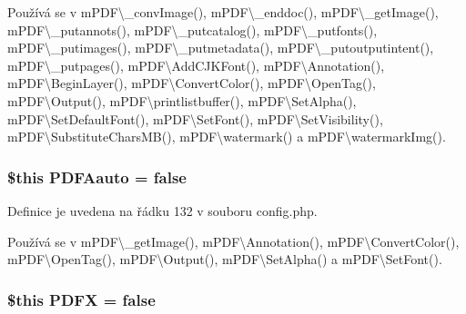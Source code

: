 Používá se v m\-P\-D\-F\textbackslash{}\-\_\-conv\-Image(), m\-P\-D\-F\textbackslash{}\-\_\-enddoc(), m\-P\-D\-F\textbackslash{}\-\_\-get\-Image(), m\-P\-D\-F\textbackslash{}\-\_\-putannots(), m\-P\-D\-F\textbackslash{}\-\_\-putcatalog(), m\-P\-D\-F\textbackslash{}\-\_\-putfonts(), m\-P\-D\-F\textbackslash{}\-\_\-putimages(), m\-P\-D\-F\textbackslash{}\-\_\-putmetadata(), m\-P\-D\-F\textbackslash{}\-\_\-putoutputintent(), m\-P\-D\-F\textbackslash{}\-\_\-putpages(), m\-P\-D\-F\textbackslash{}\-Add\-C\-J\-K\-Font(), m\-P\-D\-F\textbackslash{}\-Annotation(), m\-P\-D\-F\textbackslash{}\-Begin\-Layer(), m\-P\-D\-F\textbackslash{}\-Convert\-Color(), m\-P\-D\-F\textbackslash{}\-Open\-Tag(), m\-P\-D\-F\textbackslash{}\-Output(), m\-P\-D\-F\textbackslash{}printlistbuffer(), m\-P\-D\-F\textbackslash{}\-Set\-Alpha(), m\-P\-D\-F\textbackslash{}\-Set\-Default\-Font(), m\-P\-D\-F\textbackslash{}\-Set\-Font(), m\-P\-D\-F\textbackslash{}\-Set\-Visibility(), m\-P\-D\-F\textbackslash{}\-Substitute\-Chars\-M\-B(), m\-P\-D\-F\textbackslash{}watermark() a m\-P\-D\-F\textbackslash{}watermark\-Img().

\hypertarget{config_8php_ae21fb063d11f26e6f6f2640316b98840}{
\subsubsection[{P\-D\-F\-Aauto}]{\setlength{\rightskip}{0pt plus 5cm}\$this P\-D\-F\-Aauto = {\bf false}}}\label{config_8php_ae21fb063d11f26e6f6f2640316b98840}


Definice je uvedena na řádku 132 v souboru config.\-php.



Používá se v m\-P\-D\-F\textbackslash{}\-\_\-get\-Image(), m\-P\-D\-F\textbackslash{}\-Annotation(), m\-P\-D\-F\textbackslash{}\-Convert\-Color(), m\-P\-D\-F\textbackslash{}\-Open\-Tag(), m\-P\-D\-F\textbackslash{}\-Output(), m\-P\-D\-F\textbackslash{}\-Set\-Alpha() a m\-P\-D\-F\textbackslash{}\-Set\-Font().

\hypertarget{config_8php_a04cdb2cc946d7bd0b29f90d6e507a4a4}{
\subsubsection[{P\-D\-F\-X}]{\setlength{\rightskip}{0pt plus 5cm}\$this P\-D\-F\-X = {\bf false}}}\label{config_8php_a04cdb2cc946d7bd0b29f90d6e507a4a4}


